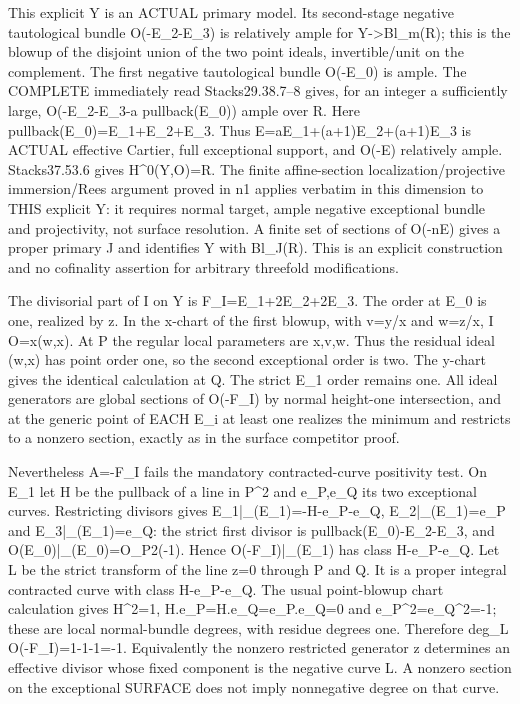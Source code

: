 \documentclass[11pt]{article}
\begin{document}
This explicit Y is an ACTUAL primary model. Its second-stage negative tautological bundle O(-E\_2-E\_3) is relatively ample for Y-\textgreater{}Bl\_m(R); this is the blowup of the disjoint union of the two point ideals, invertible/unit on the complement. The first negative tautological bundle O(-E\_0) is ample. The COMPLETE immediately read Stacks29.38.7--8 gives, for an integer a sufficiently large, O(-E\_2-E\_3-a pullback(E\_0)) ample over R. Here pullback(E\_0)=E\_1+E\_2+E\_3. Thus E=aE\_1+(a+1)E\_2+(a+1)E\_3 is ACTUAL effective Cartier, full exceptional support, and O(-E) relatively ample. Stacks37.53.6 gives H\textasciicircum{}0(Y,O)=R. The finite affine-section localization/projective immersion/Rees argument proved in n1 applies verbatim in this dimension to THIS explicit Y: it requires normal target, ample negative exceptional bundle and projectivity, not surface resolution. A finite set of sections of O(-nE) gives a proper primary J and identifies Y with Bl\_J(R). This is an explicit construction and no cofinality assertion for arbitrary threefold modifications.

The divisorial part of I on Y is F\_I=E\_1+2E\_2+2E\_3. The order at E\_0 is one, realized by z. In the x-chart of the first blowup, with v=y/x and w=z/x, I O=x(w,x). At P the regular local parameters are x,v,w. Thus the residual ideal (w,x) has point order one, so the second exceptional order is two. The y-chart gives the identical calculation at Q. The strict E\_1 order remains one. All ideal generators are global sections of O(-F\_I) by normal height-one intersection, and at the generic point of EACH E\_i at least one realizes the minimum and restricts to a nonzero section, exactly as in the surface competitor proof.

Nevertheless A=-F\_I fails the mandatory contracted-curve positivity test. On E\_1 let H be the pullback of a line in P\textasciicircum{}2 and e\_P,e\_Q its two exceptional curves. Restricting divisors gives E\_1|\_(E\_1)=-H-e\_P-e\_Q, E\_2|\_(E\_1)=e\_P and E\_3|\_(E\_1)=e\_Q: the strict first divisor is pullback(E\_0)-E\_2-E\_3, and O(E\_0)|\_(E\_0)=O\_P2(-1). Hence
O(-F\_I)|\_(E\_1) has class H-e\_P-e\_Q.
Let L be the strict transform of the line z=0 through P and Q. It is a proper integral contracted curve with class H-e\_P-e\_Q. The usual point-blowup chart calculation gives H\textasciicircum{}2=1, H.e\_P=H.e\_Q=e\_P.e\_Q=0 and e\_P\textasciicircum{}2=e\_Q\textasciicircum{}2=-1; these are local normal-bundle degrees, with residue degrees one. Therefore deg\_L O(-F\_I)=1-1-1=-1. Equivalently the nonzero restricted generator z determines an effective divisor whose fixed component is the negative curve L. A nonzero section on the exceptional SURFACE does not imply nonnegative degree on that curve.
\end{document}
